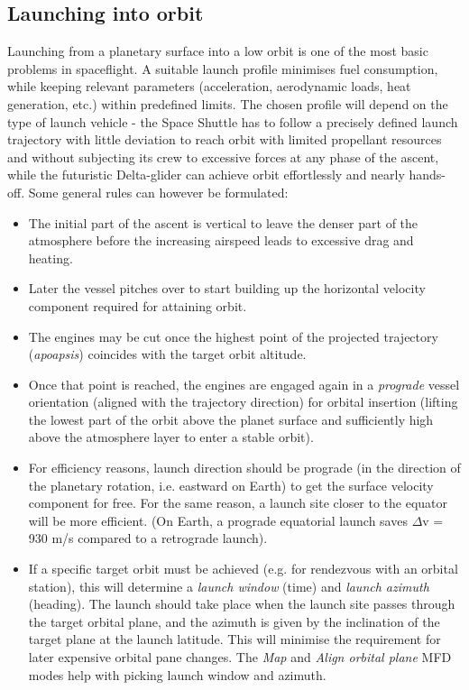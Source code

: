 \documentclass[Orbiter User Manual.tex]{subfiles}
\begin{document}
\subsection{Launching into orbit}
\label{ssec:basic_launch}
Launching from a planetary surface into a low orbit is one of the most basic problems in spaceflight. A suitable launch profile minimises fuel consumption, while keeping relevant parameters (acceleration, aerodynamic loads, heat generation, etc.) within predefined limits. The chosen profile will depend on the type of launch vehicle - the Space Shuttle has to follow a precisely defined launch trajectory with little deviation to reach orbit with limited propellant resources and without subjecting its crew to excessive forces at any phase of the ascent, while the futuristic Delta-glider can achieve orbit effortlessly and nearly hands-off. Some general rules can however be formulated:

\begin{itemize}
\item The initial part of the ascent is vertical to leave the denser part of the atmosphere before the increasing airspeed leads to excessive drag and heating.
\item Later the vessel pitches over to start building up the horizontal velocity component required for attaining orbit.
\item The engines may be cut once the highest point of the projected trajectory (\textit{apoapsis}) coincides with the target orbit altitude.
\item Once that point is reached, the engines are engaged again in a \textit{prograde} vessel orientation (aligned with the trajectory direction) for orbital insertion (lifting the lowest part of the orbit above the planet surface and sufficiently high above the atmosphere layer to enter a stable orbit).
\item For efficiency reasons, launch direction should be prograde (in the direction of the planetary rotation, i.e. eastward on Earth) to get the surface velocity component for free. For the same reason, a launch site closer to the equator will be more efficient. (On Earth, a prograde equatorial launch saves $\Delta$v = 930 m/s compared to a retrograde launch).
\item If a specific target orbit must be achieved (e.g. for rendezvous with an orbital station), this will determine a \textit{launch window} (time) and \textit{launch azimuth} (heading). The launch should take place when the launch site passes through the target orbital plane, and the azimuth is given by the inclination of the target plane at the launch latitude. This will minimise the requirement for later expensive orbital pane changes. The \textit{Map} and \textit{Align orbital plane} MFD modes help with picking launch window and azimuth.
\end{itemize}
\end{document}
